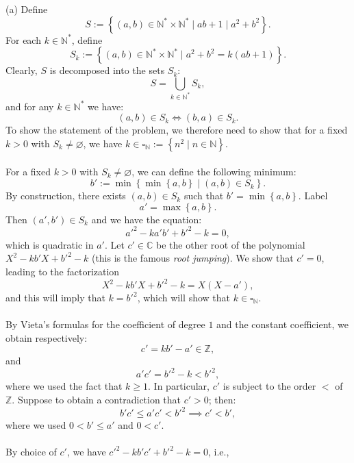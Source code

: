 \begin{solution}
    (a) Define
    \[
        S := \left\{ \left(a,b\right) \in \mathbb{N}^{*} \times \mathbb{N}^{*} \mid ab+1 \mid a^2 + b^2 \right\}.
    \]
    For each \( k \in \mathbb{N}^{*} \), define
    \[
        S_k := \left\{ \left(a,b\right) \in \mathbb{N}^{*} \times \mathbb{N}^{*} \mid a^2 + b^2 = k\left(ab+1\right) \right\}.
    \]
    Clearly, \( S \) is decomposed into the sets \( S_k \):
    \[
        S = \bigcup_{k \in \mathbb{N}^{*}} S_k,
    \]
    and for any \( k \in \mathbb{N}^{*} \) we have:
    \[
        \left(a,b\right) \in S_k \Leftrightarrow \left(b,a\right) \in S_k.
    \]
    To show the statement of the problem, we therefore need to show that for a fixed \( k > 0 \) with \( S_k \neq \varnothing \), we have \( k \in \square_{\mathbb{N}} := \left\{ n^2 \mid n \in \mathbb{N} \right\} \).
    \\\\
    For a fixed \( k > 0 \) with \( S_k \neq \varnothing \), we can define the following minimum:
    \[
        b' := \min \left\{ \min\left\{a,b\right\} \mid \left(a,b\right) \in S_k \right\}.
    \]
    By construction, there exists \( \left(a,b\right) \in S_k \) such that \( b' = \min\left\{a,b\right\} \). Label
    \[
        a' = \max\left\{a, b\right\}.
    \]
    Then \( \left(a',b'\right) \in S_k \) and we have the equation:
    \[
        a'^2 - k a' b' + b'^2 - k = 0,
    \]
    which is quadratic in \( a' \). Let \( c' \in \mathbb{C} \) be the other root of the polynomial \( X^2 - k b' X + b'^2 - k \) (this is the famous \textit{root jumping}). We show that \( c' = 0 \), leading to the factorization
    \[
        X^2 - k b' X + b'^2 - k = X\left(X - a'\right),
    \]
    and this will imply that \( k = b'^2 \), which will show that \( k\in\square_{\mathbb{N}} \).
    \\\\
    By Vieta's formulas for the coefficient of degree \( 1 \) and the constant coefficient, we obtain respectively:
    \[
        c' = k b' - a' \in \mathbb{Z},
    \]
    and
    \[
        a' c' = b'^2 - k < b'^2,
    \]
    where we used the fact that \( k \geq 1 \). In particular, \( c' \) is subject to the order \( < \) of \( \mathbb{Z} \). Suppose to obtain a contradiction that \( c' > 0 \); then:
    \[
        b' c' \leq a' c' < b'^2 \implies c' < b',
    \]
    where we used \( 0 < b' \leq a' \) and \( 0 < c' \).
    \\\\
    By choice of \( c' \), we have \( c'^2 - k b' c' + b'^2 - k = 0 \), i.e.,

\end{solution}

